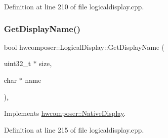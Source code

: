 Definition at line 210 of file logicaldisplay.\+cpp.


\begin{DoxyCode}{0}
\end{DoxyCode}
\mbox{\label{classhwcomposer_1_1LogicalDisplay_a93e917448b225c7342d34ef589090987}} 
\subsubsection{\texorpdfstring{Get\+Display\+Name()}{GetDisplayName()}}
{\footnotesize\ttfamily bool hwcomposer\+::\+Logical\+Display\+::\+Get\+Display\+Name (\begin{DoxyParamCaption}\item[{uint32\+\_\+t $\ast$}]{size,  }\item[{char $\ast$}]{name }\end{DoxyParamCaption})\hspace{0.3cm}{\ttfamily [override]}, {\ttfamily [virtual]}}



Implements \mbox{\hyperlink{classhwcomposer_1_1NativeDisplay_a28c095d6d08c84e40b5d5160d038f0b5}{hwcomposer\+::\+Native\+Display}}.



Definition at line 215 of file logicaldisplay.\+cpp.


